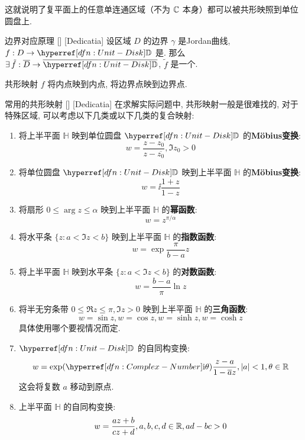         \begin{rmk}
            [Dedicatia]
            这就说明了复平面上的任意单连通区域（不为 \(\operatorname{\mathbb{C}}\) 本身）都可以被共形映照到单位圆盘上.
        \end{rmk}

        \begin{thm}
            {边界对应原理}
            []
            [Dedicatia]
            设区域 \(D\) 的边界 \(\gamma\) 是Jordan曲线, \(f:D\to\D\) 是\ConformalMapping. 那么 \(\exists\,\tilde{f}:\overline{D}\to\overline{\D}\), \(\tilde{f}\) 是一个\ConformalMapping.
        \end{thm}

        \begin{rmk}
            [Dedicatia]
            共形映射 \(f\) 将内点映到内点, 将边界点映到边界点.
        \end{rmk}

        \begin{xmp}
            {常用的共形映射}
            []
            [Dedicatia]
            在求解实际问题中, 共形映射一般是很难找的, 对于特殊区域, 可以考虑以下几类或以下几类的复合映射:
            \begin{enumerate}
                \item 将上半平面 \(\mathbb{H}\) 映到单位圆盘 \(\D\) 的\textbf{M\"obius变换}: \[w=\frac{z-z_0}{z-\overline{z_0}}, \Im z_0>0\]
                \item 将单位圆盘 \(\D\) 映到上半平面 \(\mathbb{H}\) 的\textbf{M\"obius变换}: \[w=\ii\frac{1+z}{1-z}\]
                \item 将扇形 \(0\leq\arg z\leq \alpha\) 映到上半平面 \(\mathbb{H}\) 的\textbf{幂函数}: \[w=z^{\pi/\alpha}\]
                \item 将水平条 \(\{z:a<\Im z<b\}\) 映到上半平面 \(\mathbb{H}\) 的\textbf{指数函数}: \[w=\exp\frac{\pi}{b-a}z\]
                \item 将上半平面 \(\mathbb{H}\) 映到水平条 \(\{z:a<\Im z<b\}\) 的\textbf{对数函数}: \[w=\frac{b-a}{\pi}\ln z\]
                \item 将半无穷条带 \(0\leq\Re z\leq\pi,\Im z>0\) 映到上半平面 \(\mathbb{H}\) 的\textbf{三角函数}: \[w=\sin z, w=\cos z, w=\sinh z, w=\cosh z\] 具体使用哪个要视情况而定.
                \item \(\D\) 的自同构变换: \[w=\exp(\ii\theta)\frac{z-a}{1-\overline{a}z}, |a|<1, \theta\in\R\] 这会将复数 \(a\) 移动到原点.
                \item 上半平面 \(\mathbb{H}\) 的自同构变换: \[w=\frac{az+b}{cz+d}, a,b,c,d\in\operatorname{\mathbb{R}}, ad-bc>0\]
            \end{enumerate}
        \end{xmp}
    
